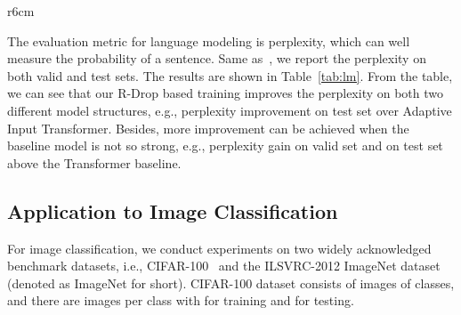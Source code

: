 \documentclass{article}
\begin{document}
\begin{wraptable}{r}{6cm}
\centering
{}
\caption{
Perplexity results on Wikitext-103 language modeling task. Adaptive refers to Adaptive Input Transformer~\cite{baevski2018adaptive}. 
}
\label{tab:lm}
\end{wraptable}



The evaluation metric for language modeling is perplexity, which can well measure the probability of a sentence. Same as~\cite{baevski2018adaptive}, we report the perplexity on both valid and test sets. 
The results are shown in Table~\ref{tab:lm}. 
From the table, we can see that our R-Drop based training improves the perplexity on both two different model structures, e.g.,  perplexity improvement on test set over Adaptive Input Transformer. 
Besides, more improvement can be achieved when the baseline model is not so strong, e.g.,  perplexity gain on valid set and  on test set above the Transformer baseline. 



\subsection{Application to Image Classification}


For image classification, we conduct experiments on two widely acknowledged benchmark datasets, i.e., CIFAR-100~\cite{krizhevsky2009learning} and the ILSVRC-2012 ImageNet dataset~\cite{deng2009imagenet} (denoted as ImageNet for short). CIFAR-100 dataset consists of  images of  classes, and there are  images per class with  for training and  for testing.
\end{document}
